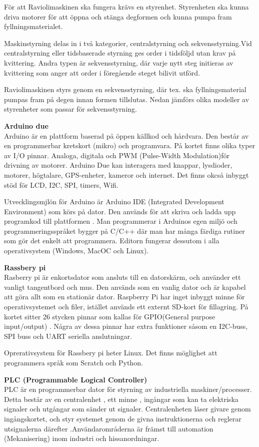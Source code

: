 För att Raviolimaskinen ska fungera krävs en styrenhet. Styrenheten ska kunna driva motorer för att öppna och stänga degformen  och kunna pumpa fram fyllningsmaterialet.

Maskinstyrning delas in  i två kategorier, centralstyrning och sekvensstyrning.Vid centralstyrning eller tidsbaserade styrning ges order i tidsföljd utan krav på kvittering. Andra typen är sekvensstyrning, där varje nytt steg initieras av kvittering som anger  att order i föregående steget bilivit utförd.

Raviolimaskinen styrs genom en sekvensstyrning, där tex. ska fyllningsmaterial pumpas fram på degen innan formen tillslutas. Nedan jämförs olika modeller av styrenheter som passar för sekvensstyrning.

\textbf{Arduino due}\\
Arduino är en plattform baserad på öppen källkod och hårdvara. Den består av en  programmerbar kretskort (mikro) och programvara. På kortet finns olika typer av I/O pinnar. Analoga, digitala och  PWM (Pulse-Width Modulation)för drivning av motorer. Arduino Due kan interagera med knappar, lysdioder, motorer, högtalare, GPS-enheter, kameror och internet. Det finns okcså inbyggt stöd för LCD, I2C, SPI, timers, Wifi.

Utvecklingsmjlön för Arduino är Arduino IDE (Integrated Development Environment) som körs på  dator. Den används för att skriva och ladda upp programkod till plattformen \cite{Arduino1}. Man programmerar i Arduinos egen miljö och programmeringsspråket bygger på  C/C++ där man har många färdiga rutiner som gör det enkelt att programmera\cite{Arduino2}. Editorn fungerar dessutom i alla operativsystem (Windows, MacOC och Linux). 
 
\textbf{Rassbery pi}\\
Rasberry pi är enkortsdator som ansluts till en datorskärm, och använder ett vanligt tangentbord och mus. Den  används som en vanlig dator och  är kapabel att göra allt som en stationär dator. Raspberry Pi har inget inbyggt minne för operativsystemet och filer, istället används ett externt SD-kort för fillagring. På kortet sitter 26 stycken pinnar som kallas för GPIO(General purpose input/output) . Några av dessa pinnar har extra funktioner såsom en I2C-buss, SPI buss och UART seriella anslutningar\cite{Raspberry1}.

Oprerativsystem för Rassbery pi heter Linux. Det finns möglighet att programmera språk som Scratch och Python.

\textbf{PLC (Programmable Logical Controller) }\\
PLC är en programmerbar dator för styrning av industriella maskiner/processer. Detta består av en centralenhet , ett minne , ingångar som kan ta elektriska signaler och utgångar som sänder ut signaler. Centralenheten läser givare genom ingångskortet, och styr systemet genom de givna instruktionerna och reglerar utsignalerna därefter .Användarområderna  är främst till automation (Mekanisering) inom industri och hissanordningar.
